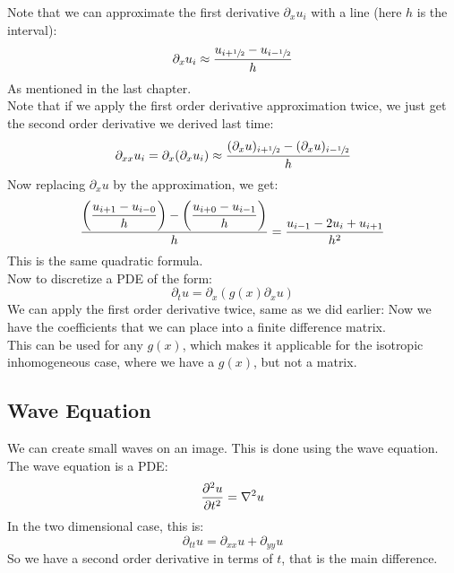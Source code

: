 \documentclass[12pt]{article}
\begin{document}
Note that we can approximate the first derivative
$\partial_x u_i$ with a line
(here $h$ is the interval):
\[ \partial_x u_i \approx \dfrac{u_{i + \sfrac{1}{2}}
- u_{i - \sfrac{1}{2}}}{h} \]
As mentioned in the last chapter. \\

Note that if we apply the first order derivative
approximation twice, we just get the second order 
derivative we derived last time:
\[ \partial_{xx} u_i
= \partial_{x}(\partial_x u_i) 
\approx \dfrac{(\partial_x u)_{i + \sfrac{1}{2}}
- (\partial_x u)_{i - \sfrac{1}{2}}}{h} \]
Now replacing $\partial_x u$ by the
approximation, we get: 
\[ \dfrac{\left( \dfrac{u_{i + 1}
- u_{i - 0}}{h} \right) - \left( \dfrac{u_{i + 0}
- u_{i - 1}}{h} \right)}{h}
= \dfrac{u_{i-1} - 2u_{i} + u_{i+1}}{h^2} \]
This is the same quadratic formula. \\

Now to discretize a PDE of the form:
\[ \partial_t u
= \partial_x(g(x) \partial_x u) \]
We can apply the first order derivative
twice, same as we did earlier:
Now we have the coefficients that we can place
into a finite difference matrix. \\
This can be used for any $g(x)$,
which makes it applicable for the isotropic
inhomogeneous case,
where we have a $g(x)$,
but not a matrix. \\

\newpage

\subsection*{Wave Equation}

We can create small waves on an image.
This is done using the wave equation. \\

The wave equation is a PDE:
\[ \dfrac{\partial ^2u}{\partial t^2} = \nabla^2 u \]
In the two dimensional case, this is:
\[ \partial_{tt}u = \partial_{xx} u + \partial_{yy} u \]
So we have a second order derivative in terms of $t$,
that is the main difference. \\
\end{document}
